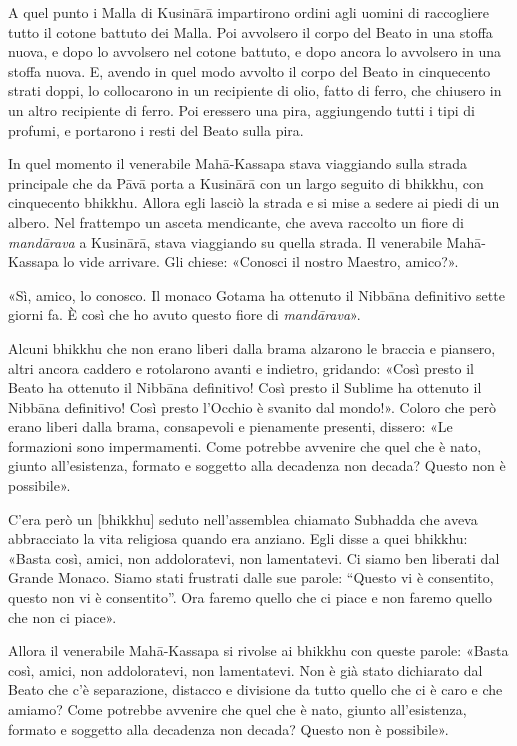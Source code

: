 A quel punto i Malla di Kusinārā impartirono ordini agli uomini di raccogliere
tutto il cotone battuto dei Malla. Poi avvolsero il corpo del Beato in una
stoffa nuova, e dopo lo avvolsero nel cotone battuto, e dopo ancora lo avvolsero
in una stoffa nuova. E, avendo in quel modo avvolto il corpo del Beato in
cinquecento strati doppi, lo collocarono in un recipiente di olio, fatto di
ferro, che chiusero in un altro recipiente di ferro. Poi eressero una pira,
aggiungendo tutti i tipi di profumi, e portarono i resti del Beato sulla pira.


In quel momento il venerabile Mahā-Kassapa stava viaggiando sulla strada
principale che da Pāvā porta a Kusinārā con un largo seguito di bhikkhu, con
cinquecento bhikkhu. Allora egli lasciò la strada e si mise a sedere ai piedi di
un albero. Nel frattempo un asceta mendicante, che aveva raccolto un fiore di
\emph{mandārava} a Kusinārā, stava viaggiando su quella strada. Il venerabile
Mahā-Kassapa lo vide arrivare. Gli chiese: «Conosci il nostro Maestro, amico?».

«Sì, amico, lo conosco. Il monaco Gotama ha ottenuto il Nibbāna definitivo sette
giorni fa. È così che ho avuto questo fiore di \emph{mandārava}».

Alcuni bhikkhu che non erano liberi dalla brama alzarono le braccia e piansero,
altri ancora caddero e rotolarono avanti e indietro, gridando: «Così presto il
Beato ha ottenuto il Nibbāna definitivo! Così presto il Sublime ha ottenuto il
Nibbāna definitivo! Così presto l’Occhio è svanito dal mondo!». Coloro che però
erano liberi dalla brama, consapevoli e pienamente presenti, dissero: «Le
formazioni sono impermamenti. Come potrebbe avvenire che quel che è nato, giunto
all’esistenza, formato e soggetto alla decadenza non decada? Questo non è
possibile».

C’era però un [bhikkhu] seduto nell’assemblea chiamato Subhadda che aveva
abbracciato la vita religiosa quando era anziano. Egli disse a quei bhikkhu:
«Basta così, amici, non addoloratevi, non lamentatevi. Ci siamo ben liberati dal
Grande Monaco. Siamo stati frustrati dalle sue parole: “Questo vi è consentito,
questo non vi è consentito”. Ora faremo quello che ci piace e non faremo quello
che non ci piace».

Allora il venerabile Mahā-Kassapa si rivolse ai bhikkhu con queste parole:
«Basta così, amici, non addoloratevi, non lamentatevi. Non è già stato
dichiarato dal Beato che c’è separazione, distacco e divisione da tutto quello
che ci è caro e che amiamo? Come potrebbe avvenire che quel che è nato, giunto
all’esistenza, formato e soggetto alla decadenza non decada? Questo non è
possibile».

